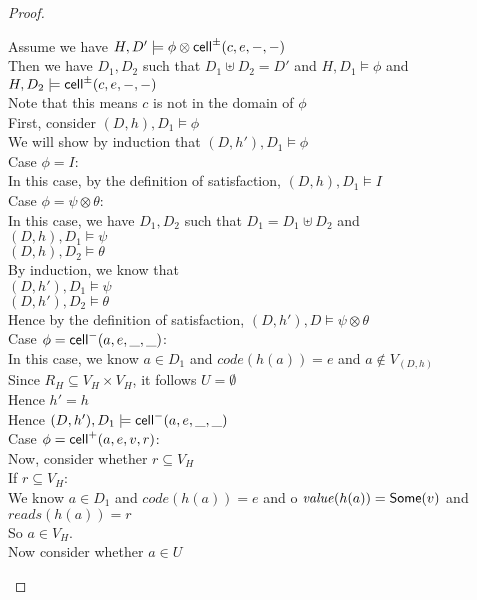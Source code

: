 \begin{proof}
\begin{tabbedproof}
\oo Assume we have $H, D' \models \phi \otimes \mathsf{cell}^{\pm}({c}, {e}, {-}, {-})$ \\
\oo Then we have $D_1, D_2$ such that $D_1 \uplus D_2 = D'$ and $H, D_1 \models \phi$ and $H, D_2 \models \mathsf{cell}^{\pm}({c}, {e}, {-}, {-})$ \\
\oo Note that this means $c$ is not in the domain of $\phi$ \\
\oo First, consider $(D,h), D_1 \models \phi$ \\
\ooo We will show by induction that $(D,h'), D_1 \models \phi$ \\
\ooo Case $\phi = I$: \\
\oooo In this case, by the definition of satisfaction, $(D,h), D_1 \models I$ \\
\ooo Case $\phi = \psi \otimes \theta$: \\
\oooo In this case, we have $D_1, D_2$ such that $D_1 = D_1 \uplus D_2$ and \\
\oooox $(D,h), D_1 \models \psi$ \\
\oooox $(D,h), D_2 \models \theta$ \\
\oooo By induction, we know that \\
\oooox $(D,h'), D_1 \models \psi$ \\
\oooox $(D,h'), D_2 \models \theta$ \\
\oooo Hence by the definition of satisfaction, $(D,h'), D \models \psi \otimes \theta$ \\
\ooo Case $\phi = \mathsf{cell}^{-}({a}, {e}, {\_}, {\_})$: \\
\oooo In this case, we know $a \in D_1$ and $\mathit{code}(h(a)) = e$ and $a \not\in V_{(D,h)}$ \\
\oooo Since $R_H \subseteq V_H \times V_H$, it follows  $U = \emptyset$ \\
\oooo Hence $h' = h$ \\
\oooo Hence $(D,h'), D_1 \models \mathsf{cell}^{-}({a}, {e}, {\_}, {\_})$ \\
\ooo Case $\phi = \mathsf{cell}^{+}({a}, {e}, {v}, {r})$: \\
\oooo Now, consider whether $r \subseteq V_H$ \\
\oooo If $r \subseteq V_H$: \\
\ooooo We know $a \in D_1$ and $\mathit{code}(h(a)) = e$ and 
 o     $\mathit{value}(h(a)) = \mathsf{Some}(v)$ and $\mathit{reads}(h(a)) = r$ \\
\ooooo So $a \in V_H$. \\
\ooooo Now consider whether $a \in U$ \\

\end{tabbedproof}
\end{proof}
